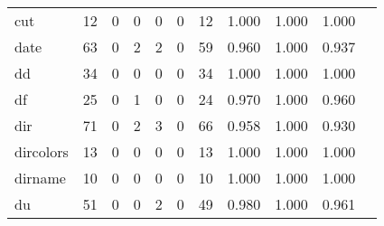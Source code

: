 \begin{longtable}{lp{1.10cm}p{1.10cm}p{1.10cm}p{1.10cm}p{1.10cm}p{1.10cm}p{1.10cm}p{1.10cm}p{1.10cm}p{1.10cm}}
cut       &                     12 &                                  0 &                                 0 &                                0 &                                 0 &                              12 &                          1.000 &                                 1.000 &                               1.000 \\
date      &                     63 &                                  0 &                                 2 &                                2 &                                 0 &                              59 &                          0.960 &                                 1.000 &                               0.937 \\
dd        &                     34 &                                  0 &                                 0 &                                0 &                                 0 &                              34 &                          1.000 &                                 1.000 &                               1.000 \\
df        &                     25 &                                  0 &                                 1 &                                0 &                                 0 &                              24 &                          0.970 &                                 1.000 &                               0.960 \\
dir       &                     71 &                                  0 &                                 2 &                                3 &                                 0 &                              66 &                          0.958 &                                 1.000 &                               0.930 \\
dircolors &                     13 &                                  0 &                                 0 &                                0 &                                 0 &                              13 &                          1.000 &                                 1.000 &                               1.000 \\
dirname   &                     10 &                                  0 &                                 0 &                                0 &                                 0 &                              10 &                          1.000 &                                 1.000 &                               1.000 \\
du        &                     51 &                                  0 &                                 0 &                                2 &                                 0 &                              49 &                          0.980 &                                 1.000 &                               0.961 \\

\end{longtable}
